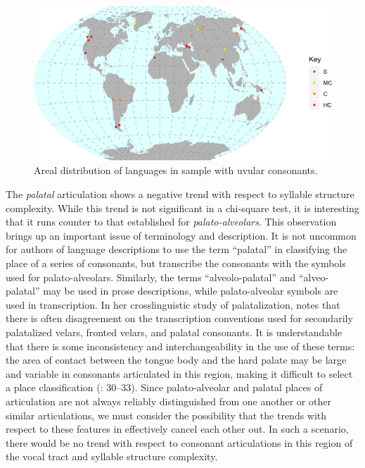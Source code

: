 \begin{figure}
\includegraphics[width=\textwidth]{figures/fig49.png}
\caption{\label{fig:4.9}Areal distribution of languages in sample with uvular consonants.}
\end{figure}

  The \textit{palatal} articulation shows a negative trend with respect to syllable structure complexity. While this trend is not significant in a chi-square test, it is interesting that it runs counter to that established for \textit{palato-alveolars}. This observation brings up an important issue of terminology and description. It is not uncommon for authors of language descriptions to use the term ``palatal'' in classifying the place of a series of consonants, but transcribe the consonants with the symbols used for palato-alveolars. Similarly, the terms ``alveolo-palatal'' and ``alveo-palatal'' may be used in prose descriptions, while palato-alveolar symbols are used in transcription. In her crosslinguistic study of palatalization, \citet{Bateman2007} notes that there is often disagreement on the transcription conventions used for secondarily palatalized velars, fronted velars, and palatal consonants. It is understandable that there is some inconsistency and interchangeability in the use of these terms: the area of contact between the tongue body and the hard palate may be large and variable in consonants articulated in this region, making it difficult to select a place classification (\citealt{LadefogedMaddieson1996}: 30--33). Since palato-alveolar and palatal places of articulation are not always reliably distinguished from one another or other similar articulations, we must consider the possibility that the trends with respect to these features in  effectively cancel each other out. In such a scenario, there would be no trend with respect to consonant articulations in this region of the vocal tract and syllable structure complexity.

